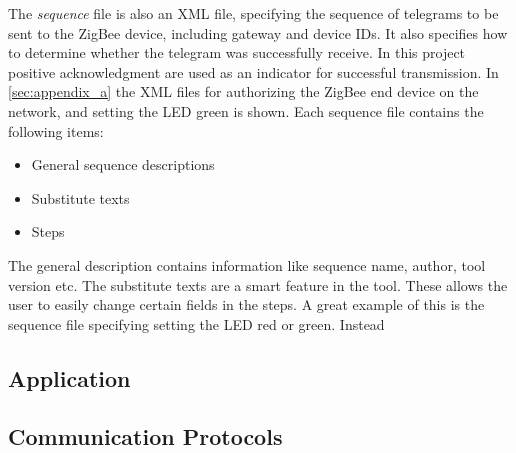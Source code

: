 \documentclass[Main]{subfiles}
\begin{document}
		The \emph{sequence} file is also an XML file, specifying the sequence of telegrams to be sent to the ZigBee device, including gateway and device IDs. 
		It also specifies how to determine whether the telegram was successfully receive. 
		In this project positive acknowledgment are used as an indicator for successful transmission.
		In \ref{sec:appendix_a} the XML files for authorizing the ZigBee end device on the network, and setting the LED green is shown.
		Each sequence file contains the following items: 
		\begin{itemize}
			\item General sequence descriptions
			\item Substitute texts
			\item Steps
		\end{itemize}
		The general description contains information like sequence name, author, tool version etc.
		The substitute texts are a smart feature in the tool. 
		These allows the user to easily change certain fields in the steps. 
		A great example of this is the sequence file specifying setting the LED red or green.
		Instead 




	\subsection{Application}



	\subsection{Communication Protocols}



\end{document}
